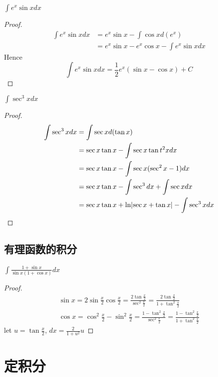 \documentclass[11pt]{article}
\begin{document}
\begin{proposition}[]
\(\int e^x\sin xdx\)
\end{proposition}

\begin{proof}
\begin{align*}
\int e^x\sin xdx&=e^x\sin x -\int\cos xd(e^x)\\
&=e^x\sin x-e^x\cos x-\int e^x\sin xdx
\end{align*}
Hence
\begin{equation*}
\int e^x\sin xdx=\frac{1}{2}e^x(\sin x-\cos x)+C
\end{equation*}
\end{proof}

\begin{proposition}[]
\(\int\sec^3xdx\)
\end{proposition}

\begin{proof}
\begin{align*}
\int\sec^3xdx&=\int\sec xd(\tan x)\\
&=\sec x\tan x-\int\sec x\tan t^2xdx\\
&=\sec x\tan x-\int\sec x(\sec^2x-1)dx\\
&=\sec x\tan x-\int\sec^3dx+\int\sec xdx\\
&=\sec x\tan x+\ln\abs{\sec x+\tan x}-\int\sec^3xdx
\end{align*}
\end{proof}
\subsection{有理函数的积分}
\label{sec:org9de016c}
\begin{proposition}[]
\(\int\frac{1+\sin x}{\sin x(1+\cos x)}dx\)
\end{proposition}

\begin{proof}
\begin{gather*}
\sin x=2\sin \frac{x}{2}\cos\frac{x}{2}=\frac{2\tan\frac{x}{2}}{\sec^2\frac{x}{2}}=
\frac{2\tan\frac{x}{2}}{1+\tan^2\frac{x}{2}}\\
\cos x=\cos^2\frac{x}{2}-\sin^2\frac{x}{2}=\frac{1-\tan^2\frac{x}{2}}{\sec^2\frac{x}{2}}=
\frac{1-\tan^2\frac{x}{2}}{1+\tan^2\frac{x}{2}}
\end{gather*}
let \(u=\tan\frac{x}{2}\), \(dx=\frac{2}{1+u^2}u\)
\end{proof}
\section{定积分}
\label{sec:org5ccd4cf}
\end{document}
